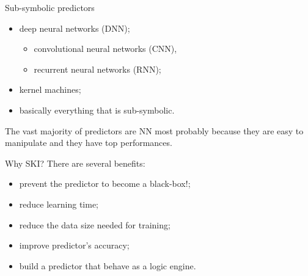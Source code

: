 \documentclass[presentation]{beamer}\mode<presentation>{\usetheme{AMSBolognaFC}}
\begin{document}
\begin{frame}[c]{Sub-symbolic predictors}
    \begin{itemize}
        \item deep neural networks (DNN);
        \begin{itemize}
            \item convolutional neural networks (CNN),
            \item recurrent neural networks (RNN);
        \end{itemize}
        \item kernel machines;
        \item basically everything that is sub-symbolic.
    \end{itemize}
    \vfill
    The vast majority of predictors are NN most probably because they are easy to manipulate and they have top performances.
\end{frame}

\begin{frame}[c]{Why SKI?}
    There are several benefits:
    \begin{itemize}
        \item prevent the predictor to become a black-box\alert{!};
        \item reduce learning time;
        \item reduce the data size needed for training;
        \item improve predictor's accuracy;
        \item build a predictor that behave as a logic engine.
    \end{itemize}
\end{frame}
\end{document}
